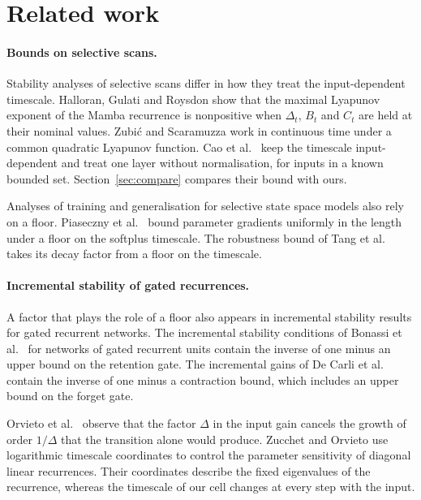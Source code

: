 \documentclass[11pt, a4paper]{article}
\theoremstyle{remark}
\theoremstyle{plain}
\begin{document}
\section{Related work}
\label{sec:related}

\paragraph{Bounds on selective scans.}
Stability analyses of selective scans differ in how they treat the input-dependent timescale.
Halloran, Gulati and Roysdon \citep{halloran2025lyapunov} show that the maximal Lyapunov exponent
of the Mamba recurrence is nonpositive when $\Delta_t$, $B_t$ and $C_t$ are held at their nominal
values. Zubi\'{c} and Scaramuzza \citep{zubic2026selective} work in continuous time under a common
quadratic Lyapunov function. Cao et al.~\citep{cao2026control} keep the timescale input-dependent
and treat one layer without normalisation, for inputs in a known bounded set.
Section~\ref{sec:compare} compares their bound with ours.

Analyses of training and generalisation for selective state space models also rely on a floor.
Piaseczny et al.~\citep{piaseczny2026distributed} bound parameter gradients uniformly in the length
under a floor on the softplus timescale. The robustness bound of Tang et
al.~\citep[Theorem~1]{tang2026selective} takes its decay factor from a floor on the timescale.

\paragraph{Incremental stability of gated recurrences.}
A factor that plays the role of a floor also appears in incremental stability results for gated
recurrent networks. The incremental stability conditions of Bonassi et al.~\citep{bonassi2021gru}
for networks of gated recurrent units contain the inverse of one minus an upper bound on the
retention gate. The incremental gains of De Carli et al.~\citep{decarli2026dgn,decarli2026mgu}
contain the inverse of one minus a contraction bound, which includes an upper bound on the forget
gate.

Orvieto et al.~\citep[Section~4]{orvieto2023lru} observe that the factor $\Delta$ in the input gain
cancels the growth of order $1/\Delta$ that the transition alone would produce. Zucchet and Orvieto
\citep{zucchet2024recurrent} use logarithmic timescale coordinates to control the parameter
sensitivity of diagonal linear recurrences. Their coordinates describe the fixed eigenvalues of the
recurrence, whereas the timescale of our cell changes at every step with the input.
\end{document}
